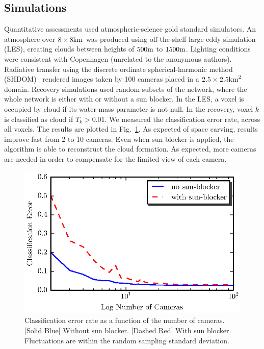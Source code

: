 \documentclass[runningheads]{llncs}
\begin{document}
\subsection*{Simulations}
\label{sec:simulation}

Quantitative assessments used atmospheric-science gold standard simulators.
An atmosphere over $8\times8{\rm km}$  was produced using off-the-shelf large eddy simulation (LES), creating clouds between heights of $500{\rm m}$ to $1500{\rm m}$.
Lighting conditions were consistent with Copenhagen (unrelated to the anonymous authors).
Radiative transfer using the discrete ordinate spherical-harmonic method (SHDOM)~\cite{Evans1998} rendered images taken by 100 cameras placed in a $2.5\times 2.5{\rm km}^2$ domain. Recovery simulations used random subsets
of the network, where the whole network is either with or without
a sun blocker. In the LES, a voxel is occupied by cloud if its water-mass parameter is not null. In the recovery, voxel $k$ is classified as cloud if $T_k>0.01$.
We measured the classification error rate, across all voxels.
The results are plotted in Fig.~\ref{fig:simulations}.  As expected of space carving,
results improve fast from 2 to 10 cameras. Even when sun blocker is applied,
the algorithm is able to reconstruct the cloud formation. As expected,
more cameras are needed in order to compensate for the limited view of
each camera.
\begin{figure}
  \begin{center}
    \includegraphics{figures/simulations.eps}
    \caption{Classification error rate as a function of the number of
    cameras. [Solid Blue] Without sun blocker. [Dashed Red] With sun blocker.
    Fluctuations are within the random sampling standard deviation.}
    \label{fig:simulations}
  \end{center}
\end{figure}
\end{document}
